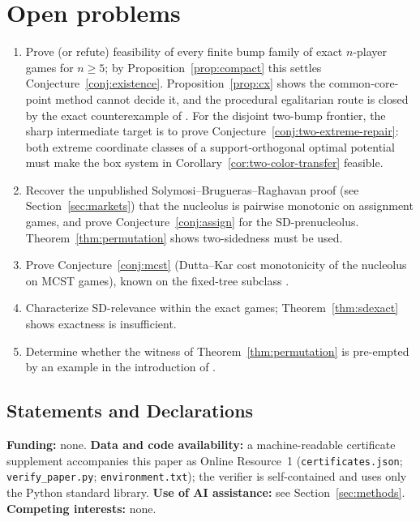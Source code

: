 \documentclass[11pt]{article}
\begin{document}
\section{Open problems}\label{sec:open}

\begin{enumerate}[leftmargin=2em]
\item Prove (or refute) feasibility of every finite bump family of exact
$n$-player games for $n\ge5$; by Proposition~\ref{prop:compact} this
settles Conjecture~\ref{conj:existence}. Proposition~\ref{prop:cx} shows
the common-core-point method cannot decide it, and the procedural egalitarian
route is closed by the exact counterexample of \citet[][Example~5]{Mauri2017}.
For the disjoint two-bump frontier, the sharp intermediate target is to prove
Conjecture~\ref{conj:two-extreme-repair}: both extreme coordinate classes of
a support-orthogonal optimal potential must make the box system in
Corollary~\ref{cor:two-color-transfer} feasible.
\item Recover the unpublished Solymosi--Brugueras--Raghavan proof
(see Section~\ref{sec:markets}) that the nucleolus is pairwise monotonic on
assignment games, and prove
Conjecture~\ref{conj:assign} for the SD-prenucleolus.
Theorem~\ref{thm:permutation} shows two-sidedness must be used.
\item Prove Conjecture~\ref{conj:mcst} (Dutta--Kar cost monotonicity of the
nucleolus on MCST games), known on the fixed-tree subclass \citep{MPR2010}.
\item Characterize SD-relevance \citep{ArinKatsev2018} within the exact
games; Theorem~\ref{thm:sdexact} shows exactness is insufficient.
\item Determine whether the witness of Theorem~\ref{thm:permutation} is
pre-empted by an example in the introduction of \citet{Miquel2009}.
\end{enumerate}

\subsection*{Statements and Declarations}
\small
\textbf{Funding:} none.
\textbf{Data and code availability:} a machine-readable certificate
supplement accompanies this paper as Online Resource~1
(\texttt{certificates.json}; \texttt{verify\_paper.py};
\texttt{environment.txt}); the verifier is self-contained and uses only
the Python standard library.
\textbf{Use of AI assistance:} see Section~\ref{sec:methods}.
\textbf{Competing interests:} none.
\normalsize
\end{document}
